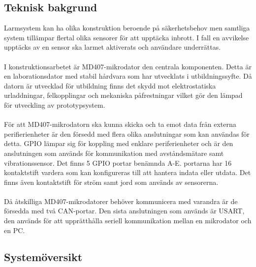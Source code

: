 \documentclass{article}
\begin{document}
\subsection{Teknisk bakgrund}
Larmsystem kan ha olika konstruktion beroende på säkerhetsbehov men samtliga system tillämpar flertal olika sensorer för att upptäcka inbrott. 
I fall en avvikelse upptäcks av en sensor ska larmet aktiverats och användare underrättas.
\\
\\
I konstruktionsarbetet är MD407-mikrodator den centrala komponenten. 
Detta är en laborationsdator med stabil hårdvara som har utvecklats i utbildningssyfte. 
Då datorn är utvecklad för utbildning finns det skydd mot elektrostatiska urladdningar, felkopplingar och mekaniska påfrestningar vilket gör den lämpad för utveckling av prototypsystem.
\\
\\
För att MD407-mikrodatorn ska kunna skicka och ta emot data från externa perifierienheter är den försedd med flera olika anslutningar som kan användas för detta. 
GPIO lämpar sig för koppling med enklare periferienheter och är den anslutningen som används för kommunikation med avståndsmätare samt vibrationssensor. 
Det finns 5 GPIO portar benämnda A-E. portarna har 16 kontaktstift vardera som kan konfigureras till att hantera indata eller utdata. 
Det finns även kontaktstift för ström samt jord som används av sensorerna.\\
\\
Då åtskilliga MD407-mikrodatorer behöver kommunicera med varandra är de försedda med två CAN-portar. Den sista anslutningen som används är USART, den används för att upprätthålla seriell kommunikation mellan en mikrodator och en PC.

\newpage
\subsection{Systemöversikt}
\end{document}
